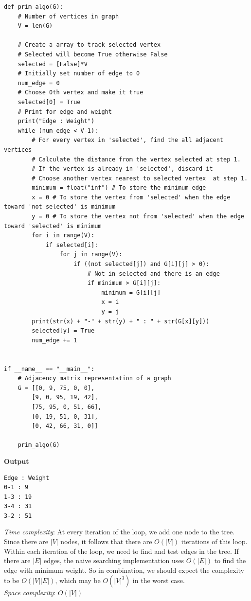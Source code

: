 \documentclass[a4paper,11pt]{book}
\begin{document}
\begin{lstlisting}
def prim_algo(G):
    # Number of vertices in graph
    V = len(G)

    # Create a array to track selected vertex
    # Selected will become True otherwise False
    selected = [False]*V
    # Initially set number of edge to 0
    num_edge = 0
    # Choose 0th vertex and make it true
    selected[0] = True
    # Print for edge and weight
    print("Edge : Weight")
    while (num_edge < V-1):
        # For every vertex in 'selected', find the all adjacent vertices
        # Calculate the distance from the vertex selected at step 1.
        # If the vertex is already in 'selected', discard it
        # Choose another vertex nearest to selected vertex  at step 1.
        minimum = float("inf") # To store the minimum edge
        x = 0 # To store the vertex from 'selected' when the edge toward 'not selected' is minimum
        y = 0 # To store the vertex not from 'selected' when the edge toward 'selected' is minimum
        for i in range(V):
            if selected[i]:
                for j in range(V):
                    if ((not selected[j]) and G[i][j] > 0):  
                        # Not in selected and there is an edge
                        if minimum > G[i][j]:
                            minimum = G[i][j]
                            x = i
                            y = j
        print(str(x) + "-" + str(y) + " : " + str(G[x][y]))
        selected[y] = True
        num_edge += 1


if __name__ == "__main__":
    # Adjacency matrix representation of a graph
    G = [[0, 9, 75, 0, 0],
        [9, 0, 95, 19, 42],
        [75, 95, 0, 51, 66],
        [0, 19, 51, 0, 31],
        [0, 42, 66, 31, 0]]

    prim_algo(G)
\end{lstlisting}
\textbf{Output}
\begin{lstlisting}
Edge : Weight
0-1 : 9
1-3 : 19
3-4 : 31
3-2 : 51
\end{lstlisting}

\noindent \textit{Time complexity}: At every iteration of the loop, we add one node to the tree. Since there are $|V|$ nodes, it follows that there are $O(|V|)$ iterations of this loop. Within each iteration of the loop, we need to find and test edges in the tree. If there are $|E|$ edges, the naive searching implementation uses $O(|E|)$ to find the edge with minimum weight. So in combination, we should expect the complexity to be $O(|V||E|)$, which may be $O(|V|^3)$ in the worst case.\\
\textit{Space complexity}: $O(|V|)$
\end{document}
